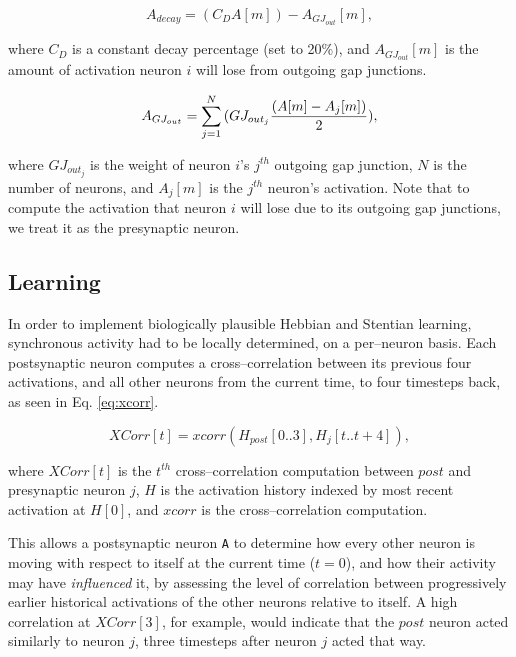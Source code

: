 \documentclass[letterpaper]{article}
\begin{document}
\begin{equation}
    A_{decay} = (C_D A[m]) - A_{GJ_{out}}[m],
\end{equation}

where $C_D$ is a constant decay percentage (set to 20\%), and $A_{GJ_{out}}[m]$ is the amount of activation neuron $i$ will lose from outgoing gap junctions. 


\begin{equation}
    A_{GJ_{out}} = \sum_{j=1}^{N}{(GJ_{out_j} {(A[m] - A_j[m]) \over 2 })},
\end{equation}

where $GJ_{out_j}$ is the weight of neuron $i$'s $j^{th}$ outgoing gap junction, $N$ is the number of neurons,  and $A_j[m]$ is the $j^{th}$ neuron's activation. Note that to compute the activation that neuron $i$ will lose due to its outgoing gap junctions, we treat it as the presynaptic neuron. 

\subsection{Learning}

In order to implement biologically plausible Hebbian and Stentian learning, synchronous activity had to be locally determined, on a per--neuron basis. Each postsynaptic neuron computes a cross--correlation between its previous four activations, and all other neurons from the current time, to four timesteps back, as seen in Eq. \ref{eq:xcorr}.

\begin{equation}
    \label{eq:xcorr}
    XCorr[t] =  xcorr(H_{post}[0..3], H_{j}[t..t+4]),
\end{equation}

where $XCorr[t]$ is the $t^{th}$ cross--correlation computation between $post$ and presynaptic neuron $j$, $H$ is the activation history indexed by most recent activation at $H[0]$, and $xcorr$ is the cross--correlation computation. 


This allows a postsynaptic neuron \texttt{A} to determine how every other neuron is moving with respect to itself at the current time ($t=0$), and how their activity may have \textit{influenced} it, by assessing the level of correlation between progressively earlier historical activations of the other neurons relative to itself. A high correlation at $XCorr[3]$, for example, would indicate that the $post$ neuron acted similarly to neuron $j$, three timesteps after neuron $j$ acted that way.
\end{document}
